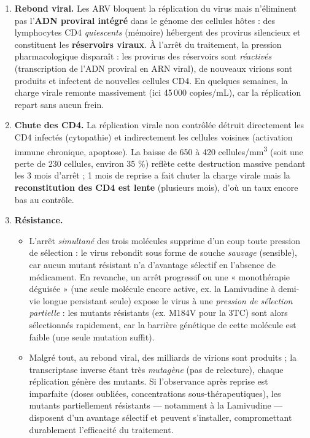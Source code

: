 \documentclass[11pt]{article}
\begin{document}
\begin{corrige}
\begin{enumerate}
    \item \textbf{Rebond viral.} Les ARV bloquent la réplication du virus mais n'éliminent pas l'\textbf{ADN proviral intégré} dans le génome des cellules hôtes : des lymphocytes CD4 \emph{quiescents} (mémoire) hébergent des provirus silencieux et constituent les \textbf{réservoirs viraux}. À l'arrêt du traitement, la pression pharmacologique disparaît : les provirus des réservoirs sont \emph{réactivés} (transcription de l'ADN proviral en ARN viral), de nouveaux virions sont produits et infectent de nouvelles cellules CD4. En quelques semaines, la charge virale remonte massivement (ici 45\,000 copies/mL), car la réplication repart sans aucun frein.
    \item \textbf{Chute des CD4.} La réplication virale non contrôlée détruit directement les CD4 infectés (cytopathie) et indirectement les cellules voisines (activation immune chronique, apoptose). La baisse de 650 à 420 cellules/mm\textsuperscript{3} (soit une perte de 230 cellules, environ 35 \%) reflète cette destruction massive pendant les 3 mois d'arrêt ; 1 mois de reprise a fait chuter la charge virale mais la \textbf{reconstitution des CD4 est lente} (plusieurs mois), d'où un taux encore bas au contrôle.
    \item \textbf{Résistance.}
    \begin{itemize}
        \item L'arrêt \emph{simultané} des trois molécules supprime d'un coup toute pression de sélection : le virus rebondit sous forme de souche \emph{sauvage} (sensible), car aucun mutant résistant n'a d'avantage sélectif en l'absence de médicament. En revanche, un arrêt progressif ou une « monothérapie déguisée » (une seule molécule encore active, ex. la Lamivudine à demi-vie longue persistant seule) expose le virus à une \emph{pression de sélection partielle} : les mutants résistants (ex. M184V pour la 3TC) sont alors sélectionnés rapidement, car la barrière génétique de cette molécule est faible (une seule mutation suffit).
        \item Malgré tout, au rebond viral, des milliards de virions sont produits ; la transcriptase inverse étant très \emph{mutagène} (pas de relecture), chaque réplication génère des mutants. Si l'observance après reprise est imparfaite (doses oubliées, concentrations sous-thérapeutiques), les mutants partiellement résistants — notamment à la Lamivudine — disposent d'un avantage sélectif et peuvent s'installer, compromettant durablement l'efficacité du traitement.

\end{itemize}
\end{enumerate}
\end{corrige}
\end{document}
